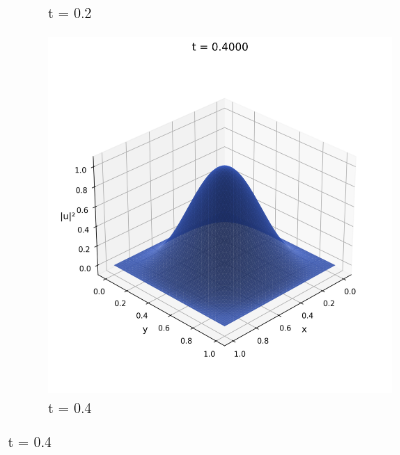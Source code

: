 \documentclass{article}
\theoremstyle{definition}
\theoremstyle{plain}
\theoremstyle{remark}
\begin{document}
\begin{figure}[h]
\begin{subfigure}[b]{0.3\textwidth}
    \caption{t = 0.2}
  \end{subfigure}
  \hfill
  \begin{subfigure}[b]{0.3\textwidth}
    \centering
    \includegraphics[width=\textwidth, trim=0cm 0cm 0cm 1cm, clip]{figures/fem_frame_0040.png}
    \caption{t = 0.4}
  \end{subfigure}
  
  \vspace{0.5cm}
  

\end{figure}
\end{document}
